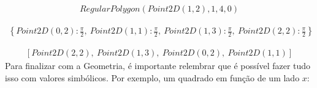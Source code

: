 \documentclass[letterpaper,10pt,english]{jupyterBook}
\begin{document}
\begin{equation*}
\begin{split}\displaystyle RegularPolygon\left(Point2D\left(1, 2\right), 1, 4, 0\right)\end{split}
\end{equation*}
\begin{sphinxVerbatim}[commandchars=\\\{\}]
 
\end{sphinxVerbatim}
\begin{equation*}
\begin{split}\displaystyle \left\{ Point2D\left(0, 2\right) : \frac{\pi}{2}, \  Point2D\left(1, 1\right) : \frac{\pi}{2}, \  Point2D\left(1, 3\right) : \frac{\pi}{2}, \  Point2D\left(2, 2\right) : \frac{\pi}{2}\right\}\end{split}
\end{equation*}
\begin{sphinxVerbatim}[commandchars=\\\{\}]
 
\end{sphinxVerbatim}
\begin{equation*}
\begin{split}\displaystyle \left[ Point2D\left(2, 2\right), \  Point2D\left(1, 3\right), \  Point2D\left(0, 2\right), \  Point2D\left(1, 1\right)\right]\end{split}
\end{equation*}
\sphinxAtStartPar
Para finalizar com a Geometria, é importante relembrar que é possível fazer tudo isso com valores simbólicos. Por exemplo, um quadrado em função de um lado \(x\):
\end{document}
